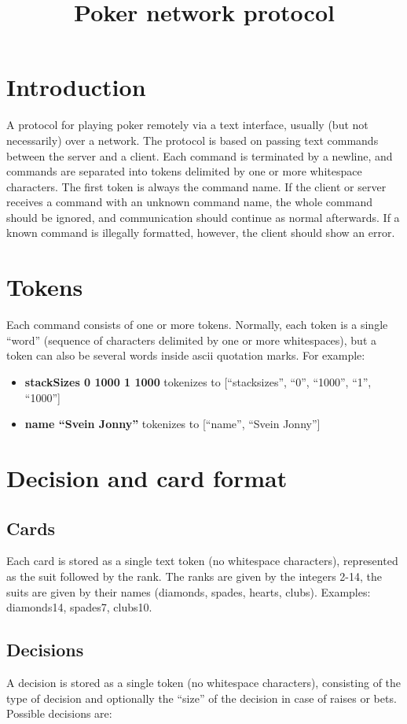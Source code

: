 \documentclass{article}
\title{Poker network protocol}
\begin{document}
\maketitle

\section{Introduction}
A protocol for playing poker remotely via a text interface, usually (but not necessarily) over a network. The protocol is based on passing text commands between the server and a client. Each command is terminated by a newline, and commands are separated into tokens delimited by one or more whitespace characters. The first token is always the command name. If the client or server receives a command with an unknown command name, the whole command should be ignored, and communication should continue as normal afterwards. If a known command is illegally formatted, however, the client should show an error.

\section{Tokens}
Each command consists of one or more tokens. Normally, each token is a single ``word'' (sequence of characters delimited by one or more whitespaces), but a token can also be several words inside ascii quotation marks. For example:
\begin{itemize}
\item \textbf{stackSizes 0 1000 1 1000} tokenizes to [``stacksizes'', ``0'', ``1000'', ``1'', ``1000'']
\item \textbf{name ``Svein Jonny''} tokenizes to [``name'', ``Svein Jonny'']
\end{itemize}

\section{Decision and card format}
\subsection*{Cards}
Each card is stored as a single text token (no whitespace characters), represented as the suit followed by the rank. The ranks are given by the integers 2-14, the suits are given by their names (diamonds, spades, hearts, clubs). Examples: diamonds14, spades7, clubs10.

\subsection*{Decisions}
A decision is stored as a single token (no whitespace characters), consisting of the type of decision and optionally the ``size'' of the decision in case of raises or bets. Possible decisions are:
\end{document}
